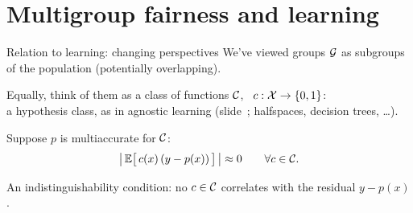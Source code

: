 
\section{Multigroup fairness and learning}

\begin{frame}{Relation to learning: changing perspectives}
  We've viewed groups $\mathcal{G}$ as subgroups of the population
  \textcolor{muted}{(potentially overlapping).}

  Equally, think of them as a class of functions
  $\mathcal{C}$, \ $c : \mathcal{X} \to \{0,1\}$:\\
  a hypothesis class, as in agnostic learning
  \textcolor{muted}{(slide~; halfspaces, decision trees, \dots)}.

  \pause
  \vspace{0.8em}
  Suppose $p$ is \alert{multiaccurate} for $\mathcal{C}$:
  \[
    \big|\,\mathbb{E}\big[\,c(x)\,(y - p(x))\,\big]\,\big| \approx 0 \qquad \forall c \in \mathcal{C} .
  \]

  An \alert{indistinguishability} condition: no $c \in \mathcal{C}$ correlates
  with the residual $y - p(x)$.
\end{frame}

